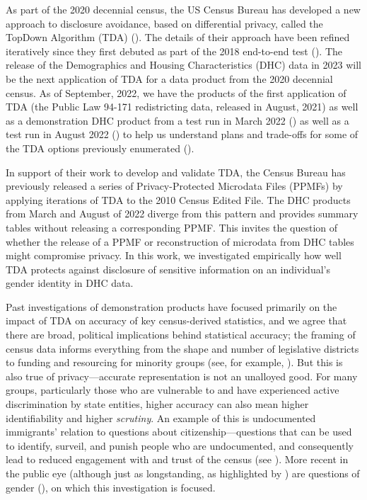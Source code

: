 \documentclass{jpc} %
\theoremstyle{plain}\newtheorem{satz}[thm]{Satz} %
\begin{document}
As part of the 2020 decennial census, the US Census Bureau has developed a new approach to disclosure avoidance, based on differential privacy, called the TopDown Algorithm (TDA) (\cite{abowd2019census}).  The details of their approach have been refined iteratively since they first debuted as part of the 2018 end-to-end test (\cite{garfinkel2019end}).  The release of the Demographics and Housing Characteristics (DHC) data in 2023 will be the next application of TDA for a data product from the 2020 decennial census. As of September, 2022, we have the products of the first application of TDA (the Public Law 94-171 redistricting data, released in August, 2021) as well as a demonstration DHC product from a test run in March 2022 (\cite{census2022demonstration}) as well as a test run in August 2022 (\cite{census2022bdemonstration}) to help us understand plans and trade-offs for some of the TDA options previously enumerated  (\cite{petti2019differential}).

In support of their work to develop and validate TDA,  the Census Bureau has previously released a series of Privacy-Protected Microdata Files (PPMFs) by applying iterations of TDA to the 2010 Census Edited File.  The DHC products from March and August of 2022 diverge from this pattern and provides summary tables without releasing a corresponding PPMF.  This invites the question of whether the release of a PPMF or reconstruction of microdata from DHC tables might compromise privacy.  In this work, we investigated empirically how well TDA protects against disclosure of sensitive information on an individual's gender identity in DHC data.

Past investigations of demonstration products have focused primarily on the impact of TDA on accuracy of key census-derived statistics,
and we agree that there are broad, political implications behind statistical accuracy; the framing of census data informs everything from the shape and number of legislative districts to funding and resourcing for minority groups (see, for example, \cite{thompson2012making}). But this is also true of privacy---accurate representation is not an unalloyed good. For many groups, particularly those who are vulnerable to and have experienced active discrimination by state entities, higher accuracy can also mean higher identifiability and higher \textit{scrutiny}. An example of this is undocumented immigrants' relation to questions about citizenship---questions that can be used to identify, surveil, and punish people who are undocumented, and consequently lead to reduced engagement with and trust of the census (see \cite{barreto2019}). More recent in the public eye (although just as longstanding, as highlighted by \cite{canaday2009straight}) are questions of gender (\cite{singer2015profusion}), on which this investigation is focused.
\end{document}
